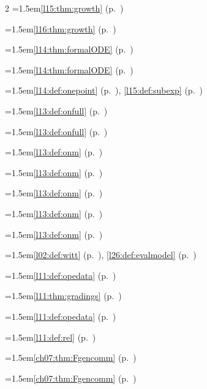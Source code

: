 \begin{multicols}{2}
\hangindent=1.5em\quad \ref{l15:thm:growth} (p.~\pageref{l15:thm:growth})\par
\hangindent=1.5em\quad \ref{l16:thm:growth} (p.~\pageref{l16:thm:growth})\par
\hangindent=1.5em\quad \ref{l14:thm:formalODE} (p.~\pageref{l14:thm:formalODE})\par
\hangindent=1.5em\quad \ref{l14:thm:formalODE} (p.~\pageref{l14:thm:formalODE})\par
\hangindent=1.5em\quad \ref{l14:def:onepoint} (p.~\pageref{l14:def:onepoint}), \ref{l15:def:subexp} (p.~\pageref{l15:def:subexp})\par
\hangindent=1.5em\quad \ref{l13:def:onfull} (p.~\pageref{l13:def:onfull})\par
\hangindent=1.5em\quad \ref{l13:def:onfull} (p.~\pageref{l13:def:onfull})\par
\hangindent=1.5em\quad \ref{l13:def:onm} (p.~\pageref{l13:def:onm})\par
\hangindent=1.5em\quad \ref{l13:def:onm} (p.~\pageref{l13:def:onm})\par
\hangindent=1.5em\quad \ref{l13:def:onm} (p.~\pageref{l13:def:onm})\par
\hangindent=1.5em\quad \ref{l13:def:onm} (p.~\pageref{l13:def:onm})\par
\hangindent=1.5em\quad \ref{l13:def:onm} (p.~\pageref{l13:def:onm})\par
\hangindent=1.5em\quad \ref{l02:def:witt} (p.~\pageref{l02:def:witt}), \ref{l26:def:evalmodel} (p.~\pageref{l26:def:evalmodel})\par
\hangindent=1.5em\quad \ref{l11:def:opedata} (p.~\pageref{l11:def:opedata})\par
\hangindent=1.5em\quad \ref{l11:thm:gradings} (p.~\pageref{l11:thm:gradings})\par
\hangindent=1.5em\quad \ref{l11:def:opedata} (p.~\pageref{l11:def:opedata})\par
\hangindent=1.5em\quad \ref{l11:def:rel} (p.~\pageref{l11:def:rel})\par
\hangindent=1.5em\quad \ref{ch07:thm:Fgencomm} (p.~\pageref{ch07:thm:Fgencomm})\par
\hangindent=1.5em\quad \ref{ch07:thm:Fgencomm} (p.~\pageref{ch07:thm:Fgencomm})\par

\end{multicols}
